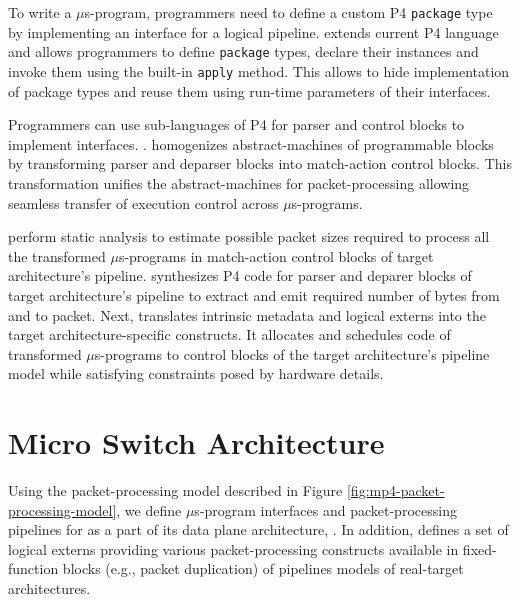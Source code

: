 \documentclass[letterpaper,twocolumn,10pt]{article}
\begin{document}
To write a $\mu$s-program, programmers need to define a custom P4 \texttt{package} type by implementing an interface for a logical pipeline.
\ucomp extends current P4 language and allows programmers to define \texttt{package} types, declare their instances and invoke them using the built-in \texttt{apply} method.
This allows to hide implementation of package types and reuse them using run-time parameters of their interfaces.


Programmers can use sub-languages of P4 for parser and control blocks to implement interfaces.
\ucomp.
\ucomp homogenizes abstract-machines of programmable blocks by transforming parser and deparser blocks into match-action control blocks.
This transformation unifies the abstract-machines for packet-processing allowing seamless transfer of execution control across $\mu$s-programs.


\ucomp perform static analysis to estimate possible packet sizes required to process all the transformed $\mu$s-programs in match-action control blocks of target architecture's pipeline.
\ucomp synthesizes P4 code for parser and deparer blocks of target architecture's pipeline to extract and emit required number of bytes from and to packet.
Next, \ucomp translates intrinsic metadata and logical externs into the target architecture-specific constructs.
It allocates and schedules code of transformed $\mu$s-programs to control blocks of the target architecture's pipeline model while satisfying constraints posed by hardware details.


\section{Micro Switch Architecture}
\label{sec:architecture}
Using the packet-processing model described in Figure \ref{fig:mp4-packet-processing-model}, we define $\mu$s-program interfaces and packet-processing pipelines for \ulang as a part of its data plane architecture, \uarch.
In addition, \uarch defines a set of logical externs providing various packet-processing constructs available in fixed-function blocks (e.g., packet duplication) of pipelines models of real-target architectures.
\end{document}

